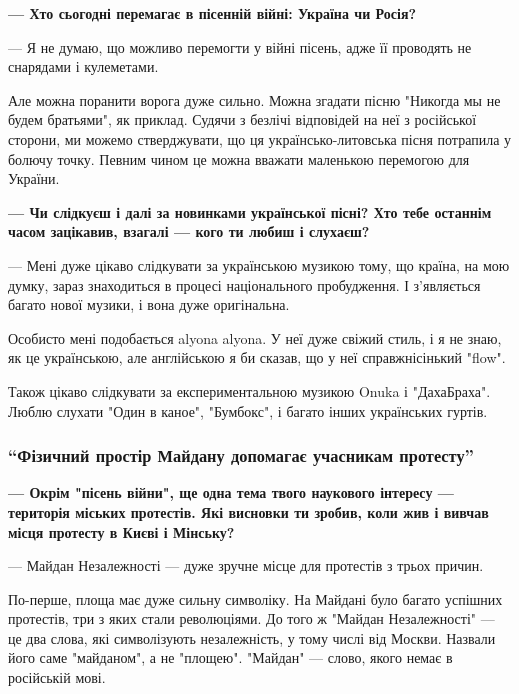 \textbf{— Хто сьогодні перемагає в пісенній війні: Україна чи Росія?}

— Я не думаю, що можливо перемогти у війні пісень, адже її проводять не
снарядами і кулеметами.

Але можна поранити ворога дуже сильно. Можна згадати пісню "Никогда мы не будем
братьями", як приклад. Судячи з безлічі відповідей на неї з російської сторони,
ми можемо стверджувати, що ця українсько-литовська пісня потрапила у болючу
точку. Певним чином це можна вважати маленькою перемогою для України. 

\textbf{— Чи слідкуєш і далі за новинками української пісні? Хто тебе останнім часом
зацікавив, взагалі — кого ти любиш і слухаєш?} 

— Мені дуже цікаво слідкувати за українською музикою тому, що країна, на мою
думку, зараз знаходиться в процесі національного пробудження. І з’являється
багато нової музики, і вона дуже оригінальна.

Особисто мені подобається alyona alyona. У неї дуже свіжий стиль, і я не знаю,
як це українською, але англійською я би сказав, що у неї справжнісінький
"flow". 

Також цікаво слідкувати за експериментальною музикою Onuka  і 
"ДахаБраха". Люблю
слухати "Один в каное", "Бумбокс", і багато інших українських гуртів. 


\subsubsection{\enquote{Фізичний простір Майдану допомагає учасникам протесту}}

\textbf{— Окрім "пісень війни", ще одна тема твого наукового інтересу — територія
міських протестів. Які висновки ти зробив, коли жив і вивчав місця протесту в
Києві і Мінську?} 

— Майдан Незалежності — дуже зручне місце для протестів з трьох причин. 

По-перше, площа має дуже сильну символіку. На Майдані було багато успішних
протестів, три з яких стали революціями. До того ж "Майдан Незалежності" — це
два слова, які символізують незалежність, у тому числі від Москви. Назвали його
саме "майданом", а не "площею". "Майдан" — слово, якого немає в російській
мові.


